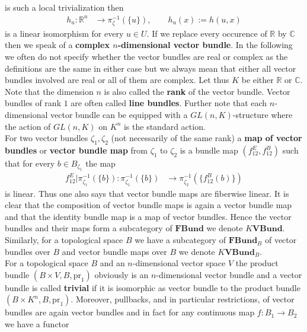 is such a local trivialization then
\begin{align*}
  h_{u}
  \colon
  \mathbb{R}^{n}
  &\to
  \pi_{\zeta}^{-1}
  \left(
    \lbrace u \rbrace
  \right)
  ,\qquad
  h_{u}(x)
  :=
  h(u,x)
\end{align*}
is a linear isomorphism for every $u \in U$. If we replace every occurence of $\mathbb{R}$ by $\mathbb{C}$ then we speak of a \textbf{complex $n$-dimensional vector bundle}. In the following we often do not specify whether the vector bundles are real or complex as the definitions are the same in either case but we always mean that either all vector bundles involved are real or all of them are complex. Let thus $K$ be either $\mathbb{R}$ or $\mathbb{C}$. Note that the dimension $n$ is also called the \textbf{rank} of the vector bundle. Vector bundles of rank $1$ are often called \textbf{line bundles}. Further note that each $n$-dimensional vector bundle can be equipped with a $GL(n,K)$-structure where the action of $GL(n,K)$ on $K^{n}$ is the standard action.
\\
For two vector bundles $\zeta_{1},\zeta_{2}$ (not necessarily of the same rank) a \textbf{map of vector bundles} or \textbf{vector bundle map} from $\zeta_{1}$ to $\zeta_{2}$ is a bundle map $(f_{12}^{E},f_{12}^{B})$ such that for every $b \in B_{\zeta_{1}}$ the map
\begin{align*}
  f_{12}^{E}
  \vert
  \pi_{\zeta_{1}}^{-1}
  \left(
    \lbrace
      b
    \rbrace
  \right)
  \colon
  \pi_{\zeta_{1}}^{-1}
  \left(
    \lbrace
      b
    \rbrace
  \right)
  &\to
  \pi_{\zeta_{2}}^{-1}
  \left(
    \lbrace
      f_{12}^{B}(b)
    \rbrace
  \right)
\end{align*}
is linear. Thus one also says that vector bundle maps are fiberwise linear. It is clear that the composition of vector bundle maps is again a vector bundle map and that the identity bundle map is a map of vector bundles. Hence the vector bundles and their maps form a subcategory of $\mathbf{FBund}$ we denote $K\mathbf{VBund}$. Similarly, for a topological space $B$ we have a subcategory of $\mathbf{FBund}_{B}$ of vector bundles over $B$ and vector bundle maps over $B$ we denote $K\mathbf{VBund}_{B}$.
\\
For a topological space $B$ and an $n$-dimensional vector space $V$ the product bundle $(B \times V,B,\mathrm{pr}_{1})$ obviously is an $n$-dimensional vector bundle and a vector bundle is called \textbf{trivial} if it is isomorphic as vector bundle to the product bundle $(B \times K^{n},B,\mathrm{pr}_{1})$. Moreover, pullbacks, and in particular restrictions, of vector bundles are again vector bundles and in fact for any continuous map $f \colon B_{1} \to B_{2}$ we have a functor
